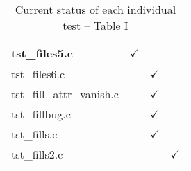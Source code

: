 \begin{table}[H]
\begin{tabular}{|l|c|c|c|}
tst\_files5.c           & $\checkmark$  &               &               \\ \hline
tst\_files6.c           &               & $\checkmark$  &               \\ \hline
tst\_fill\_attr\_vanish.c   &           & $\checkmark$  &               \\ \hline
tst\_fillbug.c          &               & $\checkmark$  &               \\ \hline
tst\_fills.c            &               & $\checkmark$  &               \\ \hline
tst\_fills2.c           &               &               & $\checkmark$  \\ \hline
\hline
\end{tabular}
\caption{\label{tab:nc_test4_status_1} Current status of each individual test -- Table I}
\end{table}

